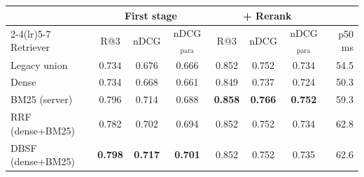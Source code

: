 \begin{tabular}{@{}lcccccc r@{}}
\toprule
 & \multicolumn{3}{c}{First stage} & \multicolumn{3}{c}{+ Rerank} & \\
\cmidrule(lr){2-4}\cmidrule(lr){5-7}
Retriever & R@3 & nDCG & nDCG$_{\text{para}}$ & R@3 & nDCG & nDCG$_{\text{para}}$ & p50 ms \\
\midrule
Legacy union & 0.734 & 0.676 & 0.666 & 0.852 & 0.752 & 0.734 & 54.5 \\
Dense & 0.734 & 0.668 & 0.661 & 0.849 & 0.737 & 0.724 & 50.3 \\
BM25 (server) & 0.796 & 0.714 & 0.688 & \textbf{0.858} & \textbf{0.766} & \textbf{0.752} & 59.3 \\
RRF (dense+BM25) & 0.782 & 0.702 & 0.694 & 0.852 & 0.752 & 0.734 & 62.8 \\
DBSF (dense+BM25) & \textbf{0.798} & \textbf{0.717} & \textbf{0.701} & 0.852 & 0.752 & 0.735 & 62.6 \\
\bottomrule
\end{tabular}
